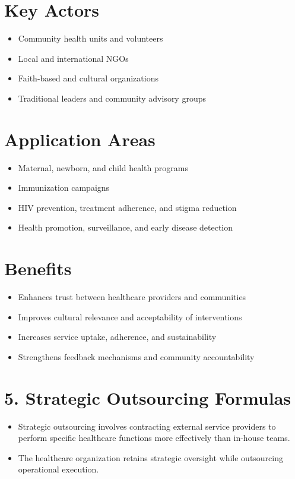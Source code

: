 \documentclass[10pt]{article}
\begin{document}
\section*{Key Actors}
\begin{itemize}
  \item Community health units and volunteers
  \item Local and international NGOs
  \item Faith-based and cultural organizations
  \item Traditional leaders and community advisory groups
\end{itemize}

\section*{Application Areas}
\begin{itemize}
  \item Maternal, newborn, and child health programs
  \item Immunization campaigns
  \item HIV prevention, treatment adherence, and stigma reduction
  \item Health promotion, surveillance, and early disease detection
\end{itemize}

\section*{Benefits}
\begin{itemize}
  \item Enhances trust between healthcare providers and communities
  \item Improves cultural relevance and acceptability of interventions
  \item Increases service uptake, adherence, and sustainability
  \item Strengthens feedback mechanisms and community accountability
\end{itemize}

\section*{5. Strategic Outsourcing Formulas}
\begin{itemize}
  \item Strategic outsourcing involves contracting external service providers to perform specific healthcare functions more effectively than in-house teams.
  \item The healthcare organization retains strategic oversight while outsourcing operational execution.
\end{itemize}
\end{document}

